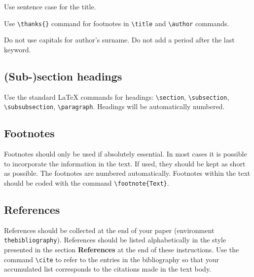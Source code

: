 \documentclass[ds]{iosart2x}
\begin{document}
Use sentence case for the title.

Use \verb|\thanks{}| command for footnotes in \verb|\title|
and \verb|\author| commands.

Do not use capitals for author's surname.
Do not add a period after the last keyword.


\subsection{(Sub-)section headings}

Use the standard \LaTeX{} commands for headings: \verb|\section|, \verb|\subsection|, \verb|\subsubsection|, \verb|\paragraph|.
Headings will be automatically numbered.

\subsection{Footnotes}
Footnotes should only be used if absolutely essential.
In most cases it is possible to incorporate the information in the text.
If used, they should be kept as short as possible.
The footnotes are numbered automatically. Footnotes within the text should be coded with the command
\verb|\footnote{Text}|.


\subsection{References}

References should be collected at the end of your paper (environment
\verb|thebibliography|). References should be listed alphabetically in the style presented in the section \textbf{References} at the
end of these instructions. Use the command \verb|\cite| to refer to the entries in the bibliography so that your
accumulated list corresponds to the citations made in the text body.
\end{document}
